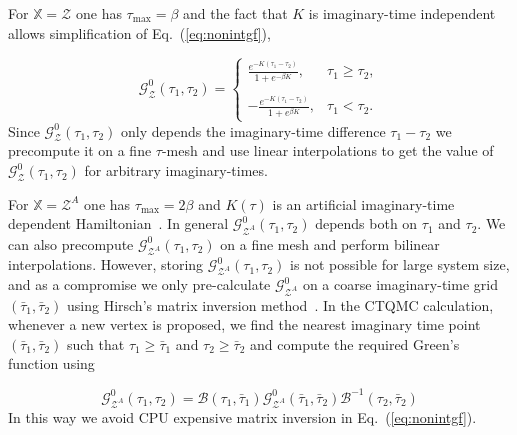 \documentclass[twocolumn,english,prl,showpacs]{revtex4}
\begin{document}
For $\mathbb{X} = \mathcal{Z}$ one has $\tau_{\max}=\beta$ and the fact that $K$ is imaginary-time independent allows simplification of Eq.~({\ref{eq:nonintgf}}),  

\begin{equation}
\mathcal{G}^{0}_{\mathcal{Z}}(\tau_{1},\tau_{2})  =\begin{cases}
 \frac{e^{-K(\tau_{1}-\tau_{2})}}{1+e^{- \beta K}}, & \text{$\tau_{1}\ge \tau_{2}$}, \\ \\
    -\frac{e^{-K(\tau_{1}-\tau_{2})}}{1+e^{\beta K}}, & \text{$\tau_{1}< \tau_{2}$}.
  \end{cases}
\end{equation}
Since $\mathcal{G}^{0}_{\mathcal{Z}}(\tau_{1},\tau_{2})$  only depends the imaginary-time difference $\tau_{1}-\tau_{2}$ we precompute it on a fine $\tau$-mesh and use linear interpolations to get the value of $\mathcal{G}^{0}_{\mathcal{Z}}(\tau_{1}, \tau_{2})$ for arbitrary imaginary-times.

For $\mathbb{X} = \mathcal{Z}^{A}$ one has $\tau_{\max}=2\beta$ and $K(\tau)$ is an artificial imaginary-time dependent Hamiltonian~\cite{Broecker:2014ud}. In general $\mathcal{G}^{0}_{\mathcal{Z}^{A}}(\tau_{1}, \tau_{2})$ depends both on $\tau_{1}$ and $\tau_{2}$. We can also precompute $\mathcal{G}^{0}_{\mathcal{Z}^{A}}(\tau_{1}, \tau_{2})$ on a fine mesh and perform bilinear interpolations. However, storing $\mathcal{G}^{0}_{\mathcal{Z}^{A}}(\tau_{1}, \tau_{2})$  is not possible for large system size, and as a compromise we only pre-calculate $\mathcal{G}^{0}_{ \mathcal{Z}^{A}}$ on a 
coarse imaginary-time grid $(\bar{\tau}_{1}, \bar{\tau}_{2}) $ using Hirsch's matrix inversion method~\cite{Hirsch:1988wo}. In the CTQMC calculation, whenever a new vertex is proposed, we find the nearest imaginary time point  $(\bar{\tau}_{1},\bar{\tau}_{2})$ such that $\tau_{1}\ge \bar{\tau}_{1}$ and $\tau_{2}\ge \bar{\tau}_{2}$  and compute the required Green's function using 

\begin{equation}
\mathcal{G}^{0}_{ \mathcal{Z}^{A}}(\tau_{1}, \tau_{2})  =  \mathcal{B}(\tau_{1}, \bar{\tau}_{1}) \mathcal{G}^{0}_{ \mathcal{Z}^{A}}(\bar{\tau}_{1}, \bar{\tau}_{2}) \mathcal{B}^{-1}(\tau_{2}, \bar{\tau}_{2}) 
\end{equation}
In this way we avoid CPU expensive matrix inversion in Eq.~(\ref{eq:nonintgf}). 
\end{document}
